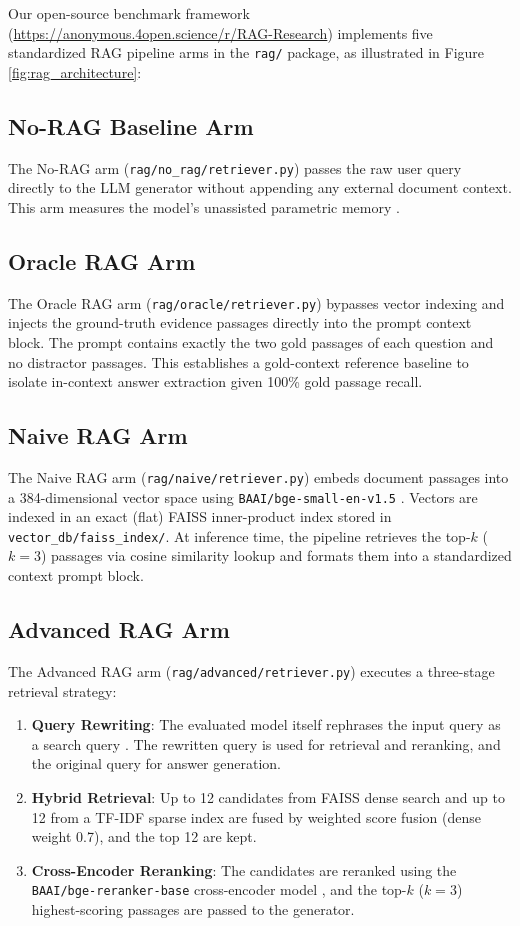 \documentclass[10pt]{article}
\def\openreview{\url{https://anonymous.4open.science/r/RAG-Research}}
\begin{document}
Our open-source benchmark framework (\openreview) implements five standardized RAG pipeline arms in the \texttt{rag/} package, as illustrated in Figure \ref{fig:rag_architecture}:

\subsection{No-RAG Baseline Arm}
The No-RAG arm (\texttt{rag/no\_rag/retriever.py}) passes the raw user query directly to the LLM generator without appending any external document context. This arm measures the model's unassisted parametric memory \citep{mallen2023when}.

\subsection{Oracle RAG Arm}
The Oracle RAG arm (\texttt{rag/oracle/retriever.py}) bypasses vector indexing and injects the ground-truth evidence passages directly into the prompt context block. The prompt contains exactly the two gold passages of each question and no distractor passages. This establishes a gold-context reference baseline to isolate in-context answer extraction given 100\% gold passage recall.

\subsection{Naive RAG Arm}
The Naive RAG arm (\texttt{rag/naive/retriever.py}) embeds document passages into a 384-dimensional vector space using \texttt{BAAI/bge-small-en-v1.5} \citep{bge2023embedding}. Vectors are indexed in an exact (flat) FAISS inner-product index \citep{johnson2019billion} stored in \texttt{vector\_db/faiss\_index/}. At inference time, the pipeline retrieves the top-$k$ ($k=3$) passages via cosine similarity lookup \citep{lewis2020retrieval} and formats them into a standardized context prompt block.

\subsection{Advanced RAG Arm}
The Advanced RAG arm (\texttt{rag/advanced/retriever.py}) executes a three-stage retrieval strategy:
\begin{enumerate}
    \item \textbf{Query Rewriting}: The evaluated model itself rephrases the input query as a search query \citep{ma2023query}. The rewritten query is used for retrieval and reranking, and the original query for answer generation.
    \item \textbf{Hybrid Retrieval}: Up to 12 candidates from FAISS dense search \citep{johnson2019billion} and up to 12 from a TF-IDF sparse index are fused by weighted score fusion (dense weight 0.7), and the top 12 are kept.
    \item \textbf{Cross-Encoder Reranking}: The candidates are reranked using the \texttt{BAAI/bge-reranker-base} cross-encoder model \citep{nogueira2019passage, bge2023embedding}, and the top-$k$ ($k=3$) highest-scoring passages are passed to the generator.
\end{enumerate}
\end{document}
